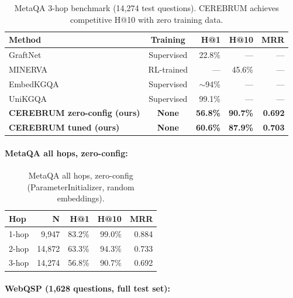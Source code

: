 \documentclass[11pt,a4paper]{article}
\begin{document}
\begin{table}[h]
\centering
\begin{tabular}{lcrrr}
\toprule
\textbf{Method} & \textbf{Training} & \textbf{H@1} & \textbf{H@10} & \textbf{MRR} \\
\midrule
GraftNet \cite{sun2018graftnet}   & Supervised & 22.8\%  & —      & —     \\
MINERVA \cite{das2018minerva}     & RL-trained & —       & 45.6\% & —     \\
EmbedKGQA \cite{saxena2020improve} & Supervised & $\sim$94\% & — & — \\
UniKGQA \cite{jiang2023}  & Supervised & 99.1\%  & —      & —     \\
\midrule
\textbf{CEREBRUM zero-config (ours)} & \textbf{None} & \textbf{56.8\%} & \textbf{90.7\%} & \textbf{0.692} \\
\textbf{CEREBRUM tuned (ours)}   & \textbf{None} & \textbf{60.6\%} & \textbf{87.9\%} & \textbf{0.703} \\
\bottomrule
\end{tabular}
\caption{MetaQA 3-hop benchmark (14,274 test questions). CEREBRUM achieves
competitive H@10 with zero training data.}
\label{tab:metaqa}
\end{table}

\paragraph{MetaQA all hops, zero-config:}

\begin{table}[h]
\centering
\begin{tabular}{lrrrr}
\toprule
\textbf{Hop} & \textbf{N} & \textbf{H@1} & \textbf{H@10} & \textbf{MRR} \\
\midrule
1-hop & 9,947  & 83.2\% & 99.0\% & 0.884 \\
2-hop & 14,872 & 63.3\% & 94.3\% & 0.733 \\
3-hop & 14,274 & 56.8\% & 90.7\% & 0.692 \\
\bottomrule
\end{tabular}
\caption{MetaQA all hops, zero-config (ParameterInitializer, random embeddings).}
\label{tab:metaqa_hops}
\end{table}

\paragraph{WebQSP (1,628 questions, full test set):}
\label{sec:webqsp}
\end{document}
